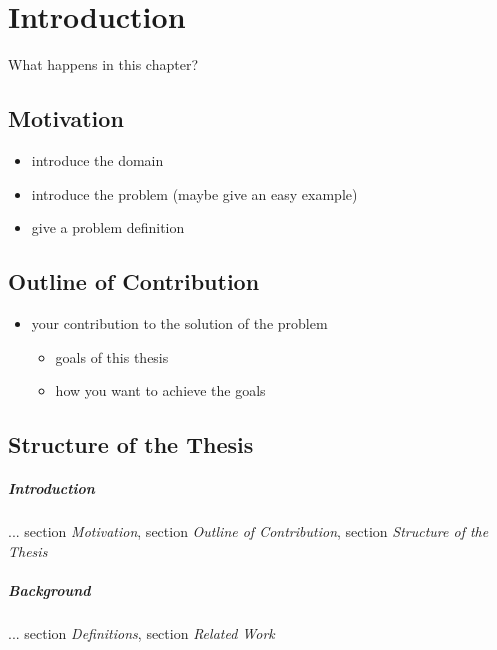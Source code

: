 \chapter{Introduction}

What happens in this chapter? 

\section{Motivation}

\begin{itemize}
\item introduce the domain
\item introduce the problem (maybe give an easy example)
\item give a problem definition \cite{Zheng:2015:TDM:2764959.2743025}
\end{itemize}

\section{Outline of Contribution}

\begin{itemize}
\item your contribution to the solution of the problem
\begin{itemize}
  \item goals of this thesis
  \item how you want to achieve the goals
\end{itemize}
\end{itemize}

\section{Structure of the Thesis}

\paragraph{Introduction} ... section \textit{Motivation}, section \textit{Outline of Contribution}, section \textit{Structure of the Thesis}

\paragraph{Background} ... section \textit{Definitions}, section \textit{Related Work}

